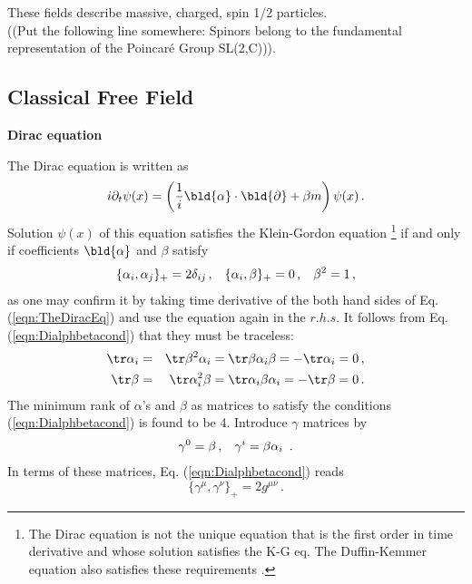 \noindent
These fields describe massive, charged, spin 1/2 particles.\\
((Put the following line somewhere: Spinors belong to the fundamental representation of the Poincar\'e Group SL(2,C))).
\subsection{Classical Free Field}
\noindent
{\bf Dirac equation}

The Dirac equation is written as
\begin{eqnarray}
i \partial_t \psi (x) = 
\left(
\frac{1}{i} \bld{\alpha} \cdot \bld{\partial} + \beta m \right) \psi(x) \,.
\label{eqn:TheDiracEq}
\end{eqnarray}
Solution $\psi(x)$ of this equation satisfies the Klein-Gordon equation
\footnote{%
The Dirac equation is not the unique equation that
is the  first order in time derivative and whose solution satisfies the K-G eq.
The Duffin-Kemmer equation  also satisfies these requirements
\cite{ref:Itzykson-Zuber}.
 } %
if and only if coefficients $\bld{\alpha}$ and $\beta$ satisfy
\begin{eqnarray}
\{ \alpha_i, \alpha_j \}_+ = 2\delta_{ij}\,,
\hspace{3mm}
\{ \alpha_i, \beta \}_+ = 0\,,
\hspace{3mm}
\beta^2 = 1\,,
\label{eqn:Dialphbetacond}
\end{eqnarray}
as one may confirm it by taking time derivative of the both hand sides of Eq. (\ref{eqn:TheDiracEq})
and use the equation again in the $r.h.s.$
It follows from Eq. (\ref{eqn:Dialphbetacond}) that they must be traceless:
\begin{eqnarray}
\tr \alpha_i &=& \tr \beta^2 \alpha_i = \tr \beta \alpha_i \beta = - \tr \alpha_i = 0 \,,
\nonumber\\
\tr \beta &=& \tr \alpha_i^2 \beta  = \tr \alpha_i \beta \alpha_i  = - \tr \beta = 0 \,.
\nonumber
\end{eqnarray}
The minimum rank of $\alpha$'s and $\beta$ as matrices to satisfy the conditions 
(\ref{eqn:Dialphbetacond}) is found to be 4. 
Introduce $\gamma$ matrices by
\begin{eqnarray}
\gamma^0 = \beta\,,
\hspace{3mm}
\gamma^i = \beta \alpha_i\ \,.
\end{eqnarray}
In terms of these matrices, Eq. (\ref{eqn:Dialphbetacond}) reads
\begin{equation}
\{ \gamma^\mu, \gamma^\nu \}_+ = 2 g^{\mu \nu}\,.
\end{equation}
